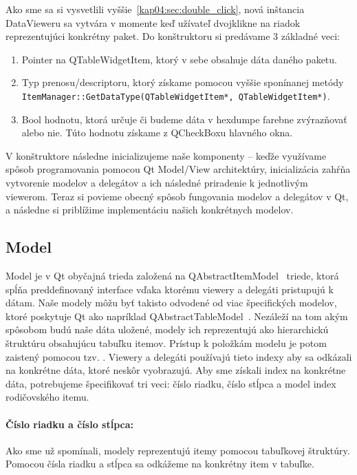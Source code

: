 Ako sme sa si vysvetlili vyššie~\ref{kap04:sec:double_click}, nová inštancia DataVieweru sa vytvára v momente keď užívateľ dvojklikne na riadok reprezentujúci konkrétny paket. Do konštruktoru si predávame 3 základné veci:
\begin{enumerate}
\item Pointer na QTableWidgetItem, ktorý v sebe obsahuje dáta daného paketu.

\item Typ prenosu/descriptoru, ktorý získame pomocou vyššie sponínanej metódy \texttt{ItemManager::GetDataType(QTableWidgetItem*, QTableWidgetItem*)}.

\item Bool hodnotu, ktorá určuje či budeme dáta v hexdumpe farebne zvýrazňovať alebo nie. Túto hodnotu získame z QCheckBoxu hlavného okna.
\end{enumerate}

V konštruktore následne inicializujeme naše komponenty -- keďže využívame spôsob programovania pomocou Qt Model/View architektúry, inicializácia zahŕňa vytvorenie modelov a delegátov a ich následné priradenie k jednotlivým viewerom. Teraz si povieme obecný spôsob fungovania modelov a delegátov v Qt, a následne si priblížime implementáciu našich konkrétnych modelov.


\subsection{Model}
Model je v Qt obyčajná trieda založená na QAbstractItemModel~\cite{qabstractitemmodel} triede, ktorá spĺňa preddefinovaný interface vďaka ktorému viewery a delegáti pristupujú k dátam. Naše modely môžu byť takisto odvodené od viac špecifických modelov, ktoré poskytuje Qt ako napríklad QAbstractTableModel~\cite{qabstracttablemodel}. Nezáleží na tom akým spôsobom budú naše dáta uložené, modely ich reprezentujú ako hierarchickú štruktúru obsahujúcu tabuľku itemov. Prístup k položkám modelu je potom zaistený pomocou tzv. . Viewery a delegáti používajú tieto indexy aby sa odkázali na konkrétne dáta, ktoré neskôr vyobrazujú. Aby sme získali index na konkrétne dáta, potrebujeme špecifikovať tri veci: číslo riadku, číslo stĺpca a model index rodičovského itemu.
\paragraph{Číslo riadku a číslo stĺpca:} Ako sme už spomínali, modely reprezentujú itemy pomocou tabuľkovej štruktúry. Pomocou čísla riadku a stĺpca sa odkážeme na konkrétny item v tabuľke.
